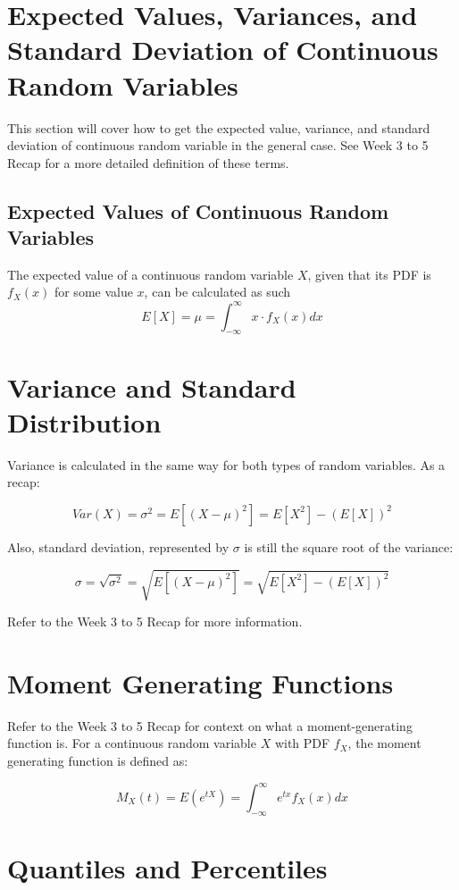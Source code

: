 \documentclass[12pt]{article}
\begin{document}
\section{Expected Values, Variances, and Standard Deviation of Continuous Random
  Variables}

This section will cover how to get the expected value, variance, and standard
deviation of continuous random variable in the general case. See Week 3
to 5 Recap for a more detailed definition of these terms.

\subsection{Expected Values of Continuous Random Variables}

The expected value of a continuous random variable $X$, given
that its PDF is $f_X(x)$ for some value $x$, can be calculated as such
\[
	E[X] = \mu = \int_{-\infty}^{\infty} x \cdot f_X(x) dx
\]

\section{Variance and Standard Distribution}

Variance is calculated in the same way for both types of random variables.
As a recap:

\[
	Var(X) = \sigma^2 = E[(X-\mu)^2] = E[X^2] - (E[X])^2
\]

Also, standard deviation, represented by $\sigma$ is still the square root of
the variance:

\[
	\sigma = \sqrt{\sigma^2} = \sqrt{E[(X-\mu)^2]} = \sqrt{E[X^2] - (E[X])^2}
\]

Refer to the Week 3 to 5 Recap for more information.

\section{Moment Generating Functions}

Refer to the Week 3 to 5 Recap for context on what a moment-generating
function is. For a continuous random variable $X$ with PDF $f_X$, the moment
generating function is defined as:


\[
	M_X(t) = E(e^{tX}) = \int_{-\infty}^{\infty} e^{tx} f_X(x) dx
\]

\section{Quantiles and Percentiles}
\end{document}
